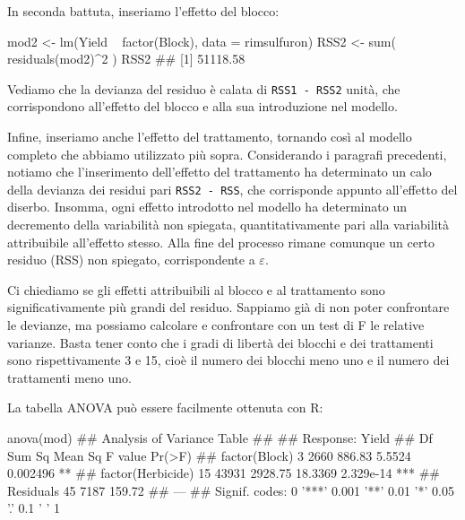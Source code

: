 \documentclass[a4paper,12pt,oneside]{book}
\newenvironment{Shaded}{}{}
\newcommand{\KeywordTok}[1]{#1}
\newcommand{\DataTypeTok}[1]{#1}
\newcommand{\DecValTok}[1]{#1}
\newcommand{\StringTok}[1]{#1}
\newcommand{\CommentTok}[1]{#1}
\newcommand{\OperatorTok}[1]{#1}
\newcommand{\NormalTok}[1]{#1}
\begin{document}
In seconda battuta, inseriamo l'effetto del blocco:

\begin{Shaded}
\begin{Highlighting}[]
\NormalTok{mod2 <-}\StringTok{ }\KeywordTok{lm}\NormalTok{(Yield }\OperatorTok{~}\StringTok{ }\KeywordTok{factor}\NormalTok{(Block), }\DataTypeTok{data =}\NormalTok{ rimsulfuron)}
\NormalTok{RSS2 <-}\StringTok{ }\KeywordTok{sum}\NormalTok{( }\KeywordTok{residuals}\NormalTok{(mod2)}\OperatorTok{^}\DecValTok{2}\NormalTok{ )}
\NormalTok{RSS2}
\CommentTok{## [1] 51118.58}
\end{Highlighting}
\end{Shaded}

Vediamo che la devianza del residuo è calata di \texttt{RSS1\ -\ RSS2} unità, che corrispondono all'effetto del blocco e alla sua introduzione nel modello.

Infine, inseriamo anche l'effetto del trattamento, tornando così al modello completo che abbiamo utilizzato più sopra. Considerando i paragrafi precedenti, notiamo che l'inserimento dell'effetto del trattamento ha determinato un calo della devianza dei residui pari \texttt{RSS2\ -\ RSS}, che corrisponde appunto all'effetto del diserbo. Insomma, ogni effetto introdotto nel modello ha determinato un decremento della variabilità non spiegata, quantitativamente pari alla variabilità attribuibile all'effetto stesso. Alla fine del processo rimane comunque un certo residuo (RSS) non spiegato, corrispondente a \(\varepsilon\).

Ci chiediamo se gli effetti attribuibili al blocco e al trattamento sono significativamente più grandi del residuo. Sappiamo già di non poter confrontare le devianze, ma possiamo calcolare e confrontare con un test di F le relative varianze. Basta tener conto che i gradi di libertà dei blocchi e dei trattamenti sono rispettivamente 3 e 15, cioè il numero dei blocchi meno uno e il numero dei trattamenti meno uno.

La tabella ANOVA può essere facilmente ottenuta con R:

\begin{Shaded}
\begin{Highlighting}[]
\KeywordTok{anova}\NormalTok{(mod)}
\CommentTok{## Analysis of Variance Table}
\CommentTok{## }
\CommentTok{## Response: Yield}
\CommentTok{##                   Df Sum Sq Mean Sq F value    Pr(>F)    }
\CommentTok{## factor(Block)      3   2660  886.83  5.5524  0.002496 ** }
\CommentTok{## factor(Herbicide) 15  43931 2928.75 18.3369 2.329e-14 ***}
\CommentTok{## Residuals         45   7187  159.72                      }
\CommentTok{## ---}
\CommentTok{## Signif. codes:  0 '***' 0.001 '**' 0.01 '*' 0.05 '.' 0.1 ' ' 1}
\end{Highlighting}
\end{Shaded}
\end{document}
